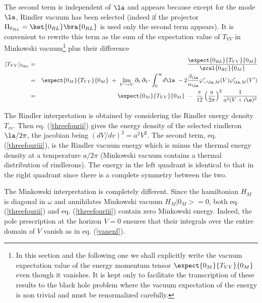 \documentclass[12pt]{article}
\begin{document}
The second term is independent of $\la$ and appears because except
for the mode
$\la$, Rindler vacuum has been selected (indeed if
the projector $\Pi_{0_{RL}} =
\ket{0_{RL}}\bra{0_{RL}}$ is used only the second term
appears). It is convenient to rewrite this term as the sum of the
expectation value of $T_{VV}$ in Minkowski vacuum\footnote{
In this section and the following one we shall explicitly write the vacuum
expectation value of the energy momentum tensor $\expect{0_M}{T_{VV}}{0_M}$
even though it vanishes. It is kept only to facilitate the transcription of
these results  to the black hole problem
where the vacuum expectation of the energy is non trivial and must be
renormalized
carefully.} plus their difference
\begin{eqnarray}
\langle T_{VV} \rangle_{0_{RL}} &=&
{\expect{0_{RL}}{T_{VV}}{0_M} \over \scal {0_{RL}}{0_M} }\nonumber\\  &=&
\expect{0_M}{T_{VV}}{0_M} \ + \
\lim_{V^\prime \rightarrow V} \partial_V\partial_{V^\prime} \int_0^\infty \!
d\la\  -2 {\beta_{\la} \over \alpha_{\la} }\varphi_{-\la,M}^*(V)
\varphi_{\la,M}^*(V^\prime) \nonumber\\
&=&\expect{0_M}{T_{VV}}{0_M} \ - \ {\pi
\over 12} \left( a \over 2 \pi \right)^2 {1 \over a^2(V + i \e)^2}
\label{threefouriii} \end{eqnarray}

The Rindler
interpretation
is obtained by
considering the Rindler energy density $T_{vv}$.
Then eq. (\ref{threefourii}) gives  the energy density of the selected
 rindleron $\la/2 \pi$, the jacobian being
$\left( d V / dv \right)^2 = a^2 V^2$.
The second term, eq. (\ref{threefouriii}), is
the  Rindler vacuum energy\cite{tmunu} which is minus the thermal energy
density at a temperature $a/2 \pi$ (Minkowski vacuum
contains a thermal distribution of rindlerons).
The energy in the left quadrant is identical to
that in the right quadrant since there is a complete symmetry between the two.

The Minkowski interpretation is completely different.
Since the hamiltonian
 $H_M$ is diagonal in
$\omega $
and annihilates
Minkowski vacuum
 $H_M |0_M>=0$, both eq. (\ref{threefourii}) and  eq. (\ref{threefouriii})
contain zero Minkowski energy. Indeed, the pole prescription at the
horizon $V=0$ ensures that their integrals over the entire
domain of $V$ vanish as in eq. (\ref{vanenf}).
\end{document}
